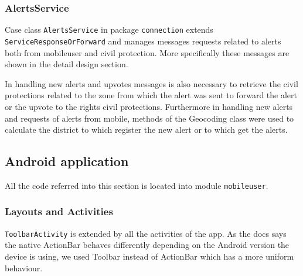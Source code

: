 \documentclass[a4paper,12pt]{report}
\begin{document}
\subsubsection{AlertsService}
Case class \texttt{AlertsService} in package \texttt{connection} extends \texttt{ServiceResponseOrForward} and manages messages requests related to alerts both from mobileuser and civil protection. More specifically these messages are shown in the detail design section.

In handling new alerts and upvotes messages is also necessary to retrieve the civil protections related to the zone from which the alert was sent to forward the alert or the upvote to the rights civil protections. Furthermore in handling new alerts and requests of alerts from mobile, methods of the Geocoding class were used to calculate the district to which register the new alert or to which get the alerts.

\subsection{Android application}

All the code referred into this section is located into module \texttt{mobileuser}.

\subsubsection{Layouts and Activities}
\texttt{ToolbarActivity} is extended by all the activities of the app. As the docs says the native ActionBar behaves differently depending on the Android version the device is using, we used Toolbar instead of ActionBar which has a more uniform behaviour.
\end{document}
